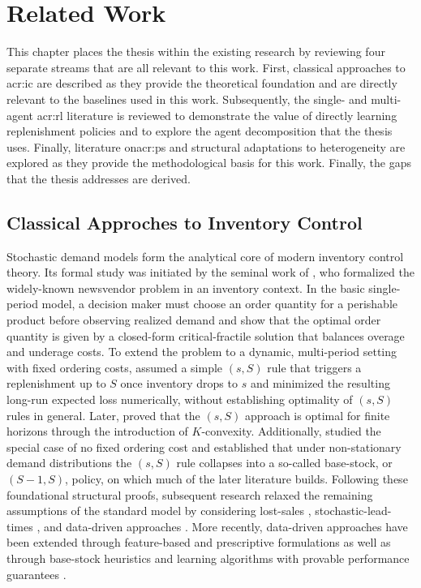 \chapter{Related Work}
\label{chap:background-and-related-work}

This chapter places the thesis within the existing research by reviewing four separate streams that are all relevant to this work. First, classical approaches to \gls{acr:ic} are described as they provide the theoretical foundation and are directly relevant to the baselines used in this work. Subsequently, the single- and multi-agent \gls{acr:rl} literature is reviewed to demonstrate the value of directly learning replenishment policies and to explore the agent decomposition that the thesis uses. Finally, literature on\gls{acr:ps} and structural adaptations to heterogeneity are explored as they provide the methodological basis for this work. Finally, the gaps that the thesis addresses are derived.\\

\section{Classical Approches to Inventory Control}
\label{sec:rw-classical}

Stochastic demand models form the analytical core of modern inventory control theory. Its formal study was initiated by the seminal work of \citet{arrow1951newsvendor}, who formalized the widely-known newsvendor problem in an inventory context. In the basic single-period model, a decision maker must choose an order quantity for a perishable product before observing realized demand and \citet{arrow1951newsvendor} show that the optimal order quantity is given by a closed-form critical-fractile solution that balances overage and underage costs. To extend the problem to a dynamic, multi-period setting with fixed ordering costs, \citet{arrow1951newsvendor} assumed a simple $(s, S)$ rule that triggers a replenishment up to $S$ once inventory drops to $s$ and minimized the resulting long-run expected loss numerically, without establishing optimality of $(s, S)$ rules in general. Later, \citet{scarf1960sSoptimality} proved that the $(s, S)$ approach is optimal for finite horizons through the introduction of $K$-convexity. Additionally, \citet{karlin1960sSoptimality} studied the special case of no fixed ordering cost and established that under non-stationary demand distributions the $(s, S)$ rule collapses into a so-called base-stock, or $(S-1, S)$, policy, on which much of the later literature builds. Following these foundational structural proofs, subsequent research relaxed the remaining assumptions of the standard model by considering lost-sales \citep{karlin1958lostsales}, stochastic-lead-times \citep{kaplan1970stochasticleadtimes}, and data-driven approaches \citep{burnetas2000datadriven,levi2007datadriven, huh2009datadriven}. More recently, data-driven approaches have been extended through feature-based and prescriptive formulations \citep{ban2019bigdata, bertsimas2020prescriptive} as well as through base-stock heuristics and learning algorithms with provable performance guarantees \citep{xin2021cappedbasestock, zhang2020learning}. 

